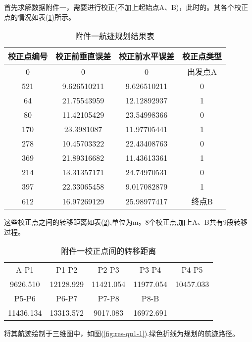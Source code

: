 首先求解数据附件一，需要进行校正(不加上起始点A、B)，此时的。其各个校正点的情况如表(\ref{tab:res-qu1-1})所示。
\begin{table}[!htbp]
	\caption{附件一航迹规划结果表} 
	\label{tab:res-qu1-1}
	\centering
	\begin{tabular}{cccc} 
		\toprule[1.5pt] 
        校正点编号 & 校正前垂直误差 & 校正前水平误差 & 校正点类型 \\
		\midrule[1pt] 
        0     & 0     & 0     & 出发点A \\
        521   & 9.626510211 & 9.626510211 & \multicolumn{1}{c}{0} \\
        64    & 21.75543959 & 12.12892937 & \multicolumn{1}{c}{1} \\
        80    & 11.42105429 & 23.54998366 & \multicolumn{1}{c}{0} \\
        170   & 23.3981087 & 11.97705441 & \multicolumn{1}{c}{1} \\
        278   & 10.45703322 & 22.43408763 & \multicolumn{1}{c}{0} \\
        369   & 21.89316682 & 11.43613361 & \multicolumn{1}{c}{1} \\
        214   & 13.31357171 & 24.74970531 & \multicolumn{1}{c}{0} \\
        397   & 22.33065458 & 9.017082879 & \multicolumn{1}{c}{1} \\
        612   & 16.97269129 & 25.98977417 & 终点B \\
		\bottomrule[1.5pt] 
\end{tabular}\end{table}

这些校正点之间的转移距离如表(\ref{tab:qu1-1-dis}),单位为m。8个校正点,加上A、B共有9段转移过程。
\begin{table}[!htbp]
	\caption{附件一校正点间的转移距离} 
	\label{tab:qu1-1-dis}
	\centering
	\begin{tabular}{ccccc} 
		\hline
        A-P1  & P1-P2 & P2-P3 & P3-P4 & P4-P5 \\
    9626.510 & 12128.929 & 11421.054 & 11977.054 & 10457.033 \\\hline \hline 
    P5-P6 & P6-P7 & P7-P8 & P8-B  &  \\
    11436.134 & 13313.572 & 9017.083 & 16972.691 &  \\ \hline 
\end{tabular}\end{table}

将其航迹绘制于三维图中，如图(\ref{fig:res-qu1-1}).\figcolor 绿色折线为规划的航迹路径。

